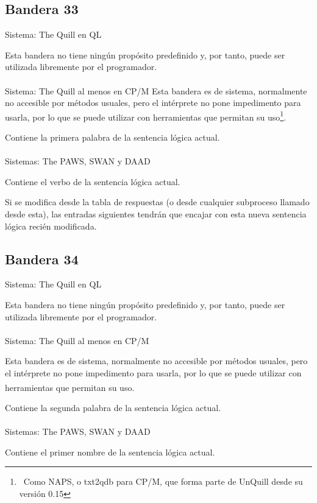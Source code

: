 \documentclass[11pt, a5paper]{article}
\newcommand{\quill}{\textsf{The Quill}\xspace}
\newcommand{\paw}{\textsf{The PAWS}\xspace}
\newcommand{\swan}{\textsf{SWAN}\xspace}
\newcommand{\daad}{\textsf{DAAD}\xspace}
\newcommand{\sistema}[1]{\noindent Sistema: #1 \nopagebreak}
\newcommand{\sistemas}[1]{\noindent Sistemas: #1 \nopagebreak}
\newcommand{\footnoteref}[2]{\hyperref[#1]{\textsuperscript{#2}}}
\begin{document}
\subsection{Bandera 33}

\sistema{\quill en QL}

Esta bandera no tiene ningún propósito predefinido y, por tanto, puede ser utilizada libremente por el programador.
\\\ \\
\sistema{\quill al menos en CP/M\cite{QuillQDB}}
Esta bandera es de sistema, normalmente no accesible por métodos usuales, pero el intérprete no pone impedimento para usarla, por lo que se puede utilizar con herramientas que permitan su uso\footnote{\ Como NAPS\cite{NAPS}, o txt2qdb para CP/M, que forma parte de UnQuill\cite{UnQuill} desde su versión 0.15\label{sysflagCPM}}\setcounter{sysflagCPM}{\value{footnote}}.

Contiene la primera palabra de la sentencia lógica actual.
\\\ \\
\sistemas{\paw, \swan y \daad}

Contiene el verbo de la sentencia lógica actual.

Si se modifica desde la tabla de respuestas (o desde cualquier subproceso llamado desde esta), las entradas siguientes tendrán que encajar con esta nueva sentencia lógica recién modificada.

\subsection{Bandera 34}

\sistema{\quill en QL}

Esta bandera no tiene ningún propósito predefinido y, por tanto, puede ser utilizada libremente por el programador.
\\\ \\
\sistema{\quill al menos en CP/M\cite{QuillQDB}}

Esta bandera es de sistema, normalmente no accesible por métodos usuales, pero el intérprete no pone impedimento para usarla, por lo que se puede utilizar con herramientas que permitan su uso\footnoteref{sysflagCPM}{\thesysflagCPM}.

Contiene la segunda palabra de la sentencia lógica actual.
\\\ \\
\sistemas{\paw, \swan y \daad}

Contiene el primer nombre de la sentencia lógica actual.
\end{document}
